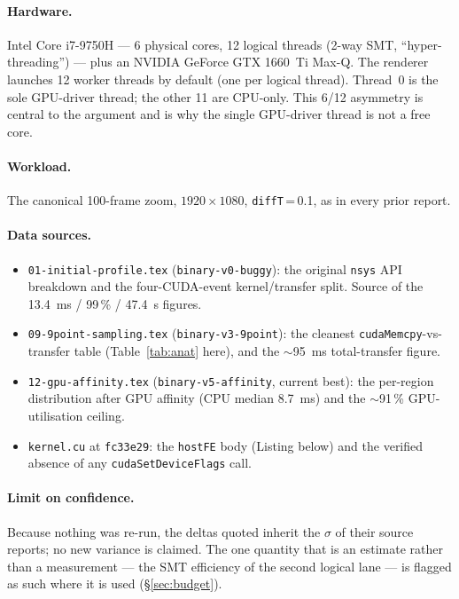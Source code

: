 \documentclass[
	english,
	letterpaper, oneside
]{article}
\begin{document}
\paragraph{Hardware.} Intel Core i7-9750H --- 6 physical cores, 12
logical threads (2-way SMT, ``hyper-threading'') --- plus an NVIDIA GeForce GTX
1660~Ti Max-Q. The renderer launches 12 worker threads by default (one per
logical thread). Thread~0 is the sole GPU-driver thread; the other 11 are
CPU-only. This 6/12 asymmetry is central to the argument and is why the
single GPU-driver thread is not a free core.

\paragraph{Workload.} The canonical 100-frame zoom, $1920\times1080$,
\texttt{diffT}\,=\,0.1, as in every prior report.

\paragraph{Data sources.}
\begin{itemize}
  \item \texttt{01-initial-profile.tex} (\texttt{binary-v0-buggy}): the original
        \texttt{nsys} API breakdown and the four-CUDA-event kernel/transfer
        split. Source of the 13.4~ms / 99\,\% / 47.4~s figures.
  \item \texttt{09-9point-sampling.tex} (\texttt{binary-v3-9point}): the cleanest
        \texttt{cudaMemcpy}-vs-transfer table (Table~\ref{tab:anat} here), and
        the $\sim$95~ms total-transfer figure.
  \item \texttt{12-gpu-affinity.tex} (\texttt{binary-v5-affinity}, current best):
        the per-region distribution after GPU affinity (CPU median 8.7~ms) and
        the $\sim$91\,\% GPU-utilisation ceiling.
  \item \texttt{kernel.cu} at \texttt{fc33e29}: the \texttt{hostFE} body
        (Listing below) and the verified absence of any
        \texttt{cudaSetDeviceFlags} call.
\end{itemize}

\paragraph{Limit on confidence.} Because nothing was re-run, the deltas quoted
inherit the $\sigma$ of their source reports; no new variance is claimed. The
one quantity that is an estimate rather than a measurement --- the SMT
efficiency of the second logical lane --- is flagged as such where it is used
(\S\ref{sec:budget}).
\end{document}
